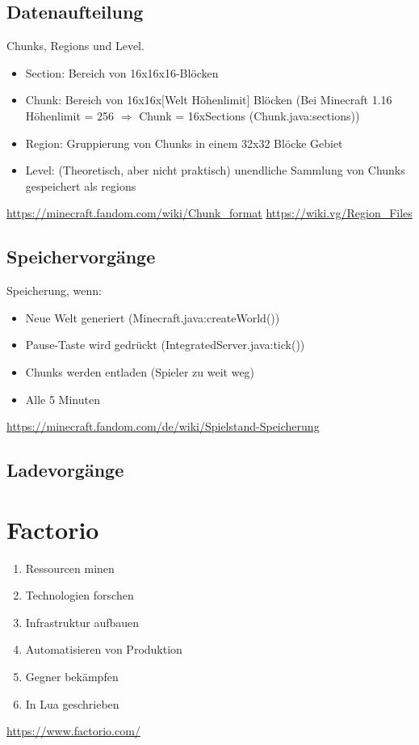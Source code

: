 \subsection{Datenaufteilung}
Chunks, Regions und Level. 

\begin{itemize}
    \item Section: Bereich von 16x16x16-Blöcken
    \item Chunk: Bereich von 16x16x$[$Welt Höhenlimit$]$ Blöcken (Bei Minecraft 1.16 Höhenlimit = 256 $\Rightarrow{}$ Chunk = 16xSections (Chunk.java:sections))
    \item Region: Gruppierung von Chunks in einem 32x32 Blöcke Gebiet
    \item Level: (Theoretisch, aber nicht praktisch) unendliche Sammlung von Chunks gespeichert als regions
\end{itemize}

\url{https://minecraft.fandom.com/wiki/Chunk_format}
\url{https://wiki.vg/Region_Files}

\subsection{Speichervorgänge}

Speicherung, wenn:
\begin{itemize}
    \item Neue Welt generiert (Minecraft.java:createWorld())
    \item Pause-Taste wird gedrückt (IntegratedServer.java:tick())
    \item Chunks werden entladen (Spieler zu weit weg)
    \item Alle 5 Minuten
\end{itemize}

\url{https://minecraft.fandom.com/de/wiki/Spielstand-Speicherung}

\subsection{Ladevorgänge}



\section{Factorio}
\begin{enumerate}
    \item Ressourcen minen 
    \item Technologien forschen
    \item Infrastruktur aufbauen
    \item Automatisieren von Produktion
    \item Gegner bekämpfen
    \item In Lua geschrieben
\end{enumerate}
\url{https://www.factorio.com/}


